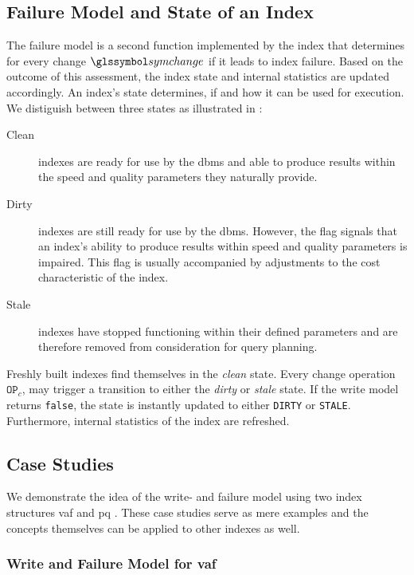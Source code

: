 \subsection{Failure Model and State of an Index}

The failure model is a second function implemented by the index that determines for every change $\symchange$ if it leads to index failure. Based on the outcome of this assessment, the index state and internal statistics are updated accordingly. An index's state determines, if and how it can be used for execution. We distiguish between three states as illustrated in :

\begin{description}
    \item[Clean] indexes are ready for use by the \acrshort{dbms} and able to produce results within the speed and quality parameters they naturally provide.
    \item[Dirty] indexes are still ready for use by the \acrshort{dbms}. However, the flag signals that an index's ability to produce results within speed and quality parameters is impaired. This flag is usually accompanied by adjustments to the cost characteristic of the index.
    \item[Stale] indexes have stopped functioning within their defined parameters and are therefore removed from consideration for query planning.
\end{description}

Freshly built indexes find themselves in the \emph{clean} state. Every change operation $\mathtt{OP}_{c}$, may trigger a transition to either the \emph{dirty} or \emph{stale} state. If the write model returns \texttt{false}, the state is instantly updated to either \texttt{DIRTY} or \texttt{STALE}. Furthermore, internal statistics of the index are refreshed. 

\subsection{Case Studies}

We demonstrate the idea of the write- and failure model using two index structures \acrshort{vaf} \cite{Weber:1998Va} and \acrshort{pq} \cite{Jegou:2010Product}. These case studies serve as mere examples and the concepts themselves can be applied to other indexes as well.

\subsubsection{Write and Failure Model for \texorpdfstring{\acrfull{vaf}}{VAF}}

